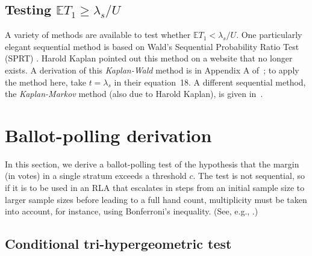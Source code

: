 \documentclass[runningheads]{llncs}
\begin{document}
\subsection{Testing $\mathbb{E} T_1 \ge \lambda_s/U$}

A variety of methods are available to test whether $\mathbb{E} T_1 < \lambda_s/U$.
One particularly elegant sequential method is based on Wald's Sequential Probability
Ratio Test (SPRT) \cite{wald45}.
Harold Kaplan pointed out this method on a website that no longer exists.
A derivation of this \emph{Kaplan-Wald} method is in Appendix A of~\cite{starkTeague14};
to apply the method here, take $t = \lambda_s$ in their equation~18.
A different sequential method, the \emph{Kaplan-Markov} method (also due to Harold Kaplan), 
is given in~\cite{stark09b}.


\section{Ballot-polling derivation}\label{sec:appendix-polling}
In this section, we derive a ballot-polling test of the hypothesis that the margin (in votes) in a single stratum exceeds a threshold $c$. 
The test is not sequential, so if it is to be used in an RLA that escalates in steps from an initial sample size to larger sample sizes before leading to a full hand count, multiplicity must be taken into account, for instance, using Bonferroni's inequality.
(See, e.g., \cite{stark08a,stark09a}.)

\subsection{Conditional tri-hypergeometric test}
\end{document}

